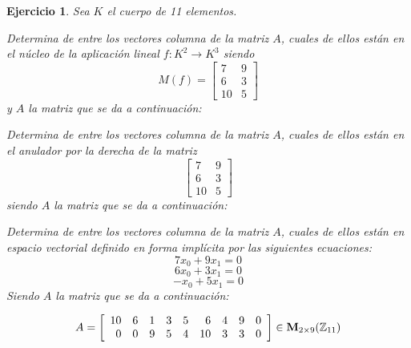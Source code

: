 \documentclass[12pt]{amsart}
\newtheorem{ejer}{Ejercicio}
\begin{document}
\begin{ejer} Sea $K$ el cuerpo de 11 elementos.
\newline
\noindent\begin{minipage}{\textwidth}
\begin{tcolorbox}[colback = green!20!white,title=Versión Núcleo]
Determina de entre los vectores columna de la matriz $A$, cuales de ellos están en el núcleo de la aplicación lineal $f:K^{2} \to K^{3}$ siendo  $$ M(f) = \left[\begin{array}{rr}
7 & 9 \\
6 & 3 \\
10 & 5
\end{array}\right] $$ y $A$ la matriz que se da a continuación:\end{tcolorbox}
\end{minipage} \newline
\noindent\begin{minipage}{\textwidth}
\begin{tcolorbox}[colback = blue!20!white,title=Versión Anulador]
Determina de entre los vectores columna de la matriz $A$, cuales de ellos están en el anulador por la derecha de la matriz $$ \left[\begin{array}{rr}
7 & 9 \\
6 & 3 \\
10 & 5
\end{array}\right] $$ siendo $A$ la matriz que se da a continuación:\end{tcolorbox}
\end{minipage} \newline
\noindent\begin{minipage}{\textwidth} 
\begin{tcolorbox}[colback = red!20!white,title=Versión Ecuaciones Implícitas]
Determina de entre los vectores columna de la matriz $A$, cuales de ellos están en espacio vectorial definido en forma implícita por las siguientes ecuaciones:
\[ 7 x_{0} + 9 x_{1} = 0 \]
\[ 6 x_{0} + 3 x_{1} = 0 \]
\[ -x_{0} + 5 x_{1} = 0 \]
Siendo $A$ la matriz que se da a continuación:
\end{tcolorbox}
\end{minipage}
\[ A = \left[\begin{array}{rrrrrrrrr}
10 & 6 & 1 & 3 & 5 & 6 & 4 & 9 & 0 \\
0 & 0 & 9 & 5 & 4 & 10 & 3 & 3 & 0
\end{array}\right] \in {\bf M}_{2\times 9}({\mathbb Z}_{11})\]
\end{ejer}
\end{document}
